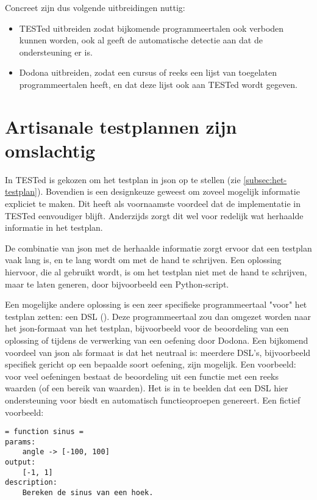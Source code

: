Concreet zijn dus volgende uitbreidingen nuttig:
\begin{itemize}
    \item TESTed uitbreiden zodat bijkomende programmeertalen ook verboden kunnen worden, ook al geeft de automatische detectie aan dat de ondersteuning er is.
    \item Dodona uitbreiden, zodat een cursus of reeks een lijst van toegelaten programmeertalen heeft, en dat deze lijst ook aan TESTed wordt gegeven.
\end{itemize}

\section{Artisanale testplannen zijn omslachtig}\label{sec:artisanale-testplannen-zijn-omslachtig}

In TESTed is gekozen om het testplan in json op te stellen (zie \cref{subsec:het-testplan}).
Bovendien is een designkeuze geweest om zoveel mogelijk informatie expliciet te maken.
Dit heeft als voornaamste voordeel dat de implementatie in TESTed eenvoudiger blijft.
Anderzijds zorgt dit wel voor redelijk wat herhaalde informatie in het testplan.

De combinatie van json met de herhaalde informatie zorgt ervoor dat een testplan vaak lang is, en te lang wordt om met de hand te schrijven.
Een oplossing hiervoor, die al gebruikt wordt, is om het testplan niet met de hand te schrijven, maar te laten generen, door bijvoorbeeld een Python-script.

Een mogelijke andere oplossing is een zeer specifieke programmeertaal "voor" het testplan zetten: een DSL ().
Deze programmeertaal zou dan omgezet worden naar het json-formaat van het testplan, bijvoorbeeld voor de beoordeling van een oplossing of tijdens de verwerking van een oefening door Dodona.
Een bijkomend voordeel van json als formaat is dat het neutraal is: meerdere DSL's, bijvoorbeeld specifiek gericht op een bepaalde soort oefening, zijn mogelijk.
Een voorbeeld: voor veel oefeningen bestaat de beoordeling uit een functie met een reeks waarden (of een bereik van waarden).
Het is in te beelden dat een DSL hier ondersteuning voor biedt en automatisch functieoproepen genereert.
Een fictief voorbeeld:

\begin{verbatim}
= function sinus =
params:
    angle -> [-100, 100]
output:
    [-1, 1]
description:
    Bereken de sinus van een hoek.
\end{verbatim}

